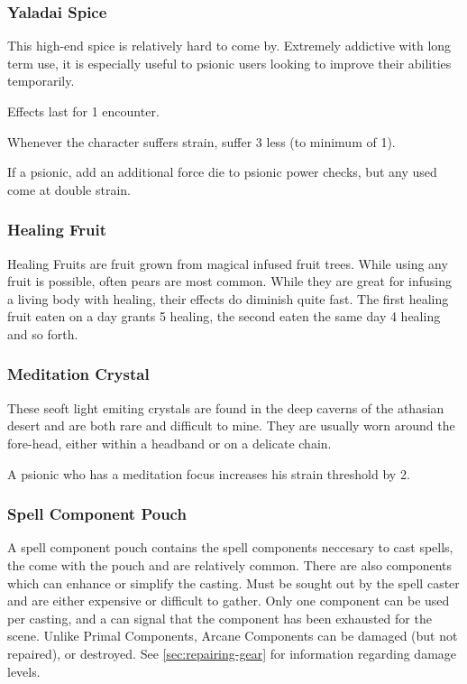 \begin{multicols}{2}
\subsubsection{Yaladai Spice} \label{itmmgc:spice}
This high-end spice is relatively hard to come by. Extremely
addictive with long term use, it is especially useful to psionic
users looking to improve their abilities temporarily.

Effects last for 1 encounter.

Whenever the character suffers strain, suffer 3 less (to
minimum of 1).

If a psionic, add an additional force die to psionic power checks,
but any \dark used come at double strain.

\subsubsection{Healing Fruit} \label{itmmgc:healingfruit}
Healing Fruits are fruit grown from magical infused fruit trees.
While using any fruit is possible, often pears are most common.
While they are great for infusing a living body with healing,
their effects do diminish quite fast. The first healing fruit
eaten on a day grants 5 healing, the second eaten the same day
4 healing and so forth.

\subsubsection{Meditation Crystal} \label{itmmgc:meditation-crystal}
These seoft light emiting crystals are found in the deep caverns of
the athasian desert and are both rare and difficult to mine. They
are usually worn around the fore-head, either within a headband or
on a delicate chain.

A psionic who has a meditation focus increases his strain threshold by 2.

\subsubsection{Spell Component Pouch}
\label{itmmgc:spellcomponentpouch}
A spell component pouch contains the spell components neccesary to cast spells, the
come with the pouch and are relatively common. There are also components which can
enhance or simplify the casting. Must be sought out by the spell caster and are either
expensive or difficult to gather. Only one component can be used per casting, and a
\despair can signal that the component has been exhausted for the scene. Unlike Primal
Components, Arcane Components can be damaged (but not repaired), or destroyed. See
\cref{sec:repairing-gear} for information regarding damage levels.


\end{multicols}
